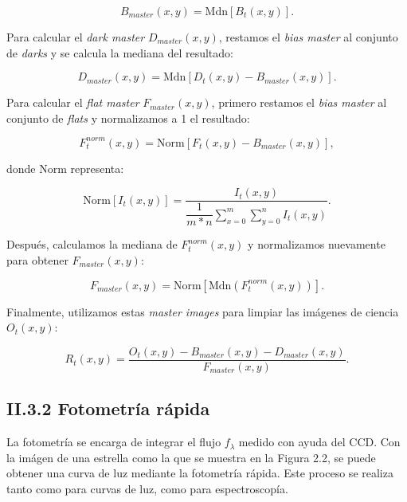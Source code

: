 \begin{equation}
  \displaystyle B_{master}(x,y) = \mbox{Mdn} \left[ B_{t}(x,y) \right].
\end{equation}

Para calcular el \textit{dark master} $D_{master}(x,y)$, restamos el \textit{bias master} al conjunto de \textit{darks} y se calcula la mediana del resultado:

\begin{equation}
  \displaystyle D_{master}(x,y) = \mbox{Mdn} \left[ D_{t}(x,y) - B_{master}(x,y)\right].
\end{equation}

Para calcular el \textit{flat master} $F_{master}(x,y)$, primero restamos el \textit{bias master} al conjunto de \textit{flats} y normalizamos a 1 el resultado:

\begin{equation}
  \displaystyle F^{norm}_{t}(x,y) = \mbox{Norm} \left[ F_{t}(x,y) - B_{master}(x,y)\right],
\end{equation}

donde $\mbox{Norm}$ representa:

\begin{equation}
  \displaystyle \mbox{Norm}\left[I_{t}(x,y)\right] =  \dfrac{I_{t}(x,y)}{\dfrac{1}{m*n} \sum_{x=0}^{m}\sum_{y=0}^{n} I_{t}(x,y)}.
\end{equation}

Después, calculamos la mediana de $F^{norm}_{t}(x,y)$ y normalizamos nuevamente para obtener $F_{master}(x,y)$:

\begin{equation}
  \displaystyle F_{master}(x,y) = \mbox{Norm} \left[ \mbox{Mdn} \left( F^{norm}_{t}(x,y)\right)\right].
\end{equation}

Finalmente, utilizamos estas \textit{master images} para limpiar las imágenes de ciencia $O_{t}(x,y)$:

\begin{equation}
  \displaystyle R_{t}(x,y) = \dfrac{O_{t}(x,y) - B_{master}(x,y) - D_{master}(x,y)}{F_{master}(x,y)}.
\end{equation}

\subsection*{II.3.2 Fotometría rápida}

La fotometría se encarga de integrar el flujo $f_{\lambda}$ medido con ayuda del CCD. Con la imágen de una estrella como la que se muestra en la Figura 2.2, se puede obtener una curva de luz mediante la fotometría rápida. Este proceso se realiza tanto como para curvas de luz, como para espectroscopía.

